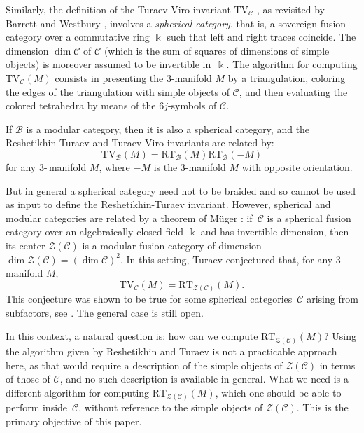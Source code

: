 \documentclass[a4paper]{amsart}
\theoremstyle{definition}
\newcommand{\cc}{\mathcal{C}}
\newcommand{\bb}{\mathcal{B}}
\newcommand{\zz}{\mathcal{Z}}
\newcommand{\kk}{\Bbbk}
\newcommand{\trait}{\nobreakdash-\hspace{0pt}}
\newcommand{\ti}{\mbox{-}\,}
\begin{document}
Similarly, the definition of the Turaev-Viro invariant $\mathrm{TV}_\cc$ \cite{TV}, as revisited by Barrett and Westbury
\cite{BW}, involves a \emph{spherical category}, that is, a sovereign fusion category over a commutative ring $\kk$
such that left and right traces coincide.  The dimension $\dim\cc$ of $\cc$ (which is the
sum of squares of dimensions of simple objects) is moreover assumed to be invertible in~$\kk$. The algorithm for computing
$\mathrm{TV}_\cc(M)$ consists in presenting the $3$\trait manifold $M$ by a triangulation, coloring the edges of the
triangulation with simple objects of $\cc$, and then evaluating the colored tetrahedra  by means of the $6j$-symbols of
$\cc$.

If $\bb$ is a modular category, then it is also a spherical category, and the Reshetikhin-Turaev and Turaev-Viro invariants
are related \cite{Tur2,JR1} by:
\begin{equation*}
\mathrm{TV}_\bb(M)=\mathrm{RT}_\bb(M)\mathrm{RT}_\bb(-M)
\end{equation*}
for any $3$\ti manifold $M$, where $-M$ is the $3$-manifold $M$ with opposite orientation.

But in general a spherical category need not to be braided and so cannot be used as input to define the Reshetikhin-Turaev invariant.
However, spherical and modular categories are related by a theorem of M\"uger \cite{Mueg}: if~$\cc$ is a spherical
fusion category over an algebraically closed field $\kk$ and has invertible dimension, then its center $\zz(\cc)$ is a
modular fusion category of dimension  $\dim\zz(\cc)=(\dim\cc)^2$. In this setting, Turaev conjectured that, for
any $3$-manifold $M$,
\begin{equation*}
\mathrm{TV}_\cc(M)= \mathrm{RT}_{\zz(\cc)}(M).
\end{equation*}
This conjecture was shown to be true for some spherical categories~$\cc$ arising from subfactors, see \cite{KSW}. The
general case is still open.

In this context, a natural question is: how can we compute $\mathrm{RT}_{\zz(\cc)}(M)$? Using the algorithm given by
Reshetikhin and Turaev is not a practicable approach here, as that would require a description of the simple objects of
$\zz(\cc)$ in terms of those of $\cc$, and no such description is available in general. What we need is a different
algorithm for computing $\mathrm{RT}_{\zz(\cc)}(M)$, which one should be able to perform inside~$\cc$, without reference to
the simple objects of $\zz(\cc)$. This is the primary objective of this paper.
\end{document}
